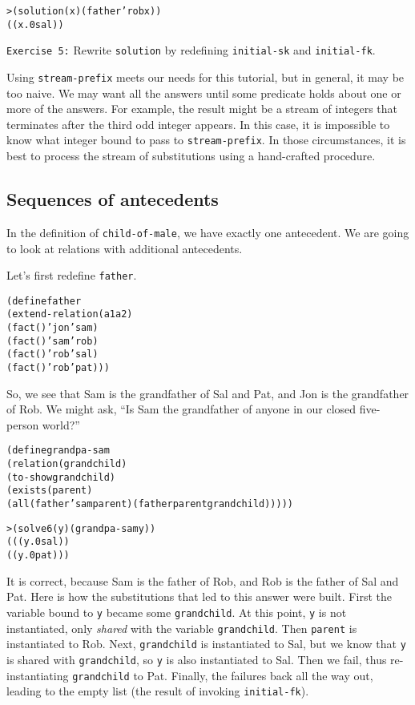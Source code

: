 \begin{alltt}
> (solution (x) (father 'rob x))
((x.0 sal))
\end{alltt}

\noindent
\texttt{Exercise 5:} Rewrite \texttt{solution} by redefining
\texttt{initial-sk} and \texttt{initial-fk}.\endofexercise

Using \texttt{stream-prefix} meets our needs for this tutorial, but in
general, it may be too naive.  We may want all the answers until some
predicate holds about one or more of the answers.  For example, the
result might be a stream of integers that terminates after the third odd
integer appears.  In this case, it is impossible to know what integer bound
to pass to \texttt{stream-prefix}.  In those circumstances, it is best
to process the stream of substitutions using a hand-crafted procedure.

\subsection{Sequences of antecedents}

In the definition of \texttt{child-of-male}, we have exactly one
antecedent.  We are going to look at relations with additional
antecedents.

Let's first redefine \texttt{father}.

\begin{alltt}
(define father
  (extend-relation (a1 a2)
    (fact () 'jon 'sam)
    (fact () 'sam 'rob)
    (fact () 'rob 'sal)
    (fact () 'rob 'pat)))
\end{alltt}

So, we see that Sam is the grandfather of Sal and Pat, and Jon is the
grandfather of Rob.  We might ask, ``Is Sam the grandfather of anyone
in our closed five-person world?''

\begin{alltt}
(define grandpa-sam
  (relation (grandchild)
    (to-show grandchild)
    (exists (parent)
      (all (father 'sam parent) (father parent grandchild)))))
\end{alltt}

\begin{alltt}
> (solve 6 (y) (grandpa-sam y))
(((y.0 sal))
 ((y.0 pat)))
\end{alltt}

It is correct, because Sam is the father of Rob, and Rob is the
father of Sal and Pat.  Here is how the substitutions that led to this
answer were built.  First the variable bound to \texttt{y} became some
\texttt{grandchild}.  At this point, \texttt{y} is not instantiated,
only \emph{shared} with the variable \texttt{grandchild}.  Then
\texttt{parent} is instantiated to Rob.  Next, \texttt{grandchild} is
instantiated to Sal, but we know that \texttt{y} is shared with
\texttt{grandchild}, so \texttt{y} is also instantiated to Sal.  Then
we fail, thus re-instantiating \texttt{grandchild} to Pat.  Finally,
the failures back all the way out, leading to the empty list (the
result of invoking \texttt{initial-fk}).


